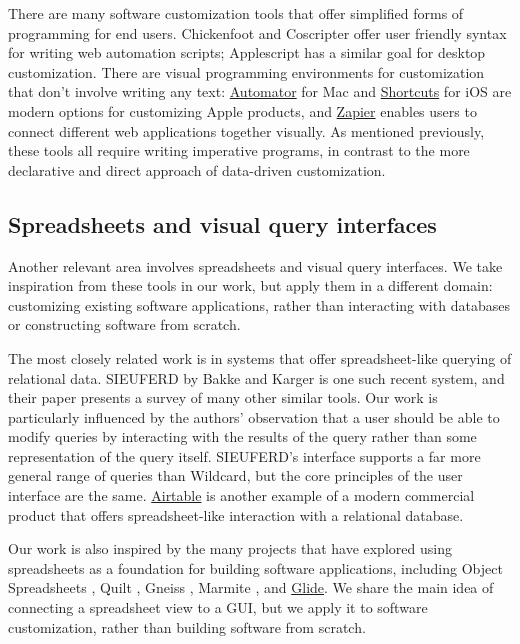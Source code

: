 \documentclass[sigplan,screen,10pt,anonymous,review]{acmart}
\begin{document}
There are many software customization tools that offer simplified forms
of programming for end users. Chickenfoot \citep{bolin2005} and
Coscripter \citep{leshed2008} offer user friendly syntax for writing web
automation scripts; Applescript \citep{cook2007} has a similar goal for
desktop customization. There are visual programming environments for
customization that don't involve writing any text:
\href{https://support.apple.com/guide/automator/welcome/mac}{Automator}
for Mac and
\href{https://apps.apple.com/us/app/shortcuts/id915249334}{Shortcuts}
for iOS are modern options for customizing Apple products, and
\href{https://zapier.com/}{Zapier} enables users to connect different
web applications together visually. As mentioned previously, these tools
all require writing imperative programs, in contrast to the more
declarative and direct approach of data-driven customization.

\hypertarget{spreadsheets-and-visual-query-interfaces}{%
\subsection{Spreadsheets and visual query
interfaces}\label{spreadsheets-and-visual-query-interfaces}}

Another relevant area involves spreadsheets and visual query interfaces.
We take inspiration from these tools in our work, but apply them in a
different domain: customizing existing software applications, rather
than interacting with databases or constructing software from scratch.

The most closely related work is in systems that offer spreadsheet-like
querying of relational data. SIEUFERD by Bakke and Karger
\citep{bakke2016} is one such recent system, and their paper presents a
survey of many other similar tools. Our work is particularly influenced
by the authors' observation that a user should be able to modify queries
by interacting with the results of the query rather than some
representation of the query itself. SIEUFERD's interface supports a far
more general range of queries than Wildcard, but the core principles of
the user interface are the same. \href{https://airtable.com/}{Airtable}
is another example of a modern commercial product that offers
spreadsheet-like interaction with a relational database.

Our work is also inspired by the many projects that have explored using
spreadsheets as a foundation for building software applications,
including Object Spreadsheets \citep{mccutchen2016}, Quilt
\citep{benson2014}, Gneiss \citep{chang2014}, Marmite \citep{wong2007},
and \href{https://www.glideapps.com/}{Glide}. We share the main idea of
connecting a spreadsheet view to a GUI, but we apply it to software
customization, rather than building software from scratch.
\end{document}

